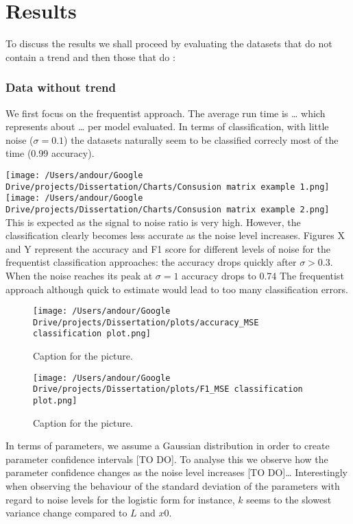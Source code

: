 \documentclass[]{article}
\begin{document}
\hypertarget{results}{%
\section{Results}\label{results}}

To discuss the results we shall proceed by evaluating the datasets that
do not contain a trend and then those that do :

\hypertarget{data-without-trend}{%
\subsubsection{Data without trend}\label{data-without-trend}}

We first focus on the frequentist approach. The average run time is
\ldots{} which represents about \ldots{} per model evaluated. In terms
of classification, with little noise (\(\sigma = 0.1\)) the datasets
naturally seem to be classified correcly most of the time (0.99
accuracy).

\texttt{[image: /Users/andour/Google Drive/projects/Dissertation/Charts/Consusion matrix example 1.png]}
\texttt{[image: /Users/andour/Google Drive/projects/Dissertation/Charts/Consusion matrix example 2.png]}
This is expected as the signal to noise ratio is very high. However, the
classification clearly becomes less accurate as the noise level
increases. Figures X and Y represent the accuracy and F1 score for
different levels of noise for the frequentist classification approaches:
the accuracy drops quickly after \(\sigma > 0.3\). When the noise
reaches its peak at \(\sigma = 1\) accuracy drops to 0.74 The
frequentist approach although quick to estimate would lead to too many
classification errors.

\begin{figure}
\centering
\texttt{[image: /Users/andour/Google Drive/projects/Dissertation/plots/accuracy\_MSE classification plot.png]}
\caption{Caption for the picture.}
\end{figure}

\begin{figure}
\centering
\texttt{[image: /Users/andour/Google Drive/projects/Dissertation/plots/F1\_MSE classification plot.png]}
\caption{Caption for the picture.}
\end{figure}

In terms of parameters, we assume a Gaussian distribution in order to
create parameter confidence intervals {[}TO DO{]}. To analyse this we
observe how the parameter confidence changes as the noise level
increases {[}TO DO{]}\ldots{} Interestingly when observing the behaviour
of the standard deviation of the parameters with regard to noise levels
for the logistic form for instance, \(k\) seems to the slowest variance
change compared to \(L\) and \(x0\).
\end{document}
